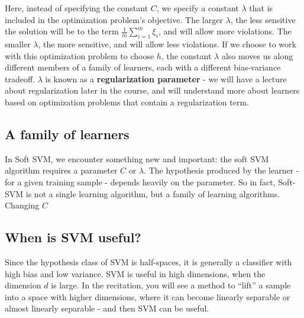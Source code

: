     Here, instead of specifying the constant $C$, we specify a constant
    $\lambda$ that is included in the optimization problem's objective. The
    larger $\lambda$, the less sensitive the solution will be to the term $\frac{1}{m}\sum_{i=1}^m
    \xi_i$, and will allow more violations. 
    The smaller $\lambda$, the more sensitive, and will allow less violations.
    If we choose to work with this optimization problem to choose $h$, the
    constant $\lambda$ also moves us along different members of a family of
    learners, each with a different bias-variance tradeoff. $\lambda$ is known
    as a {\bf regularization parameter} - we will have a lecture about
    regularization later in the course, and will understand more about learners
    based on optimization problems that contain a regularization term.


    \subsection{A family of learners}

    In Soft SVM, we encounter something new and important: the soft SVM
    algorithm requires a parameter $C$ or $\lambda$. The hypothesis produced by
    the learner - for a given training sample - depends heavily on the
    parameter. So in fact, Soft-SVM is not a single learning algorithm, but a
    family of learning algorithms. Changing $C$ 

    \subsection{When is SVM useful?}

    Since the hypothesis class of SVM is half-spaces, it is generally a
    classifier with high bias and low variance. SVM is useful in high
    dimensions, when the dimension $d$ is large. In the recitation, you will see
    a method to ``lift'' a sample into a space with higher dimensions, where it
    can become linearly separable or almost linearly separable - and then SVM
    can be useful.




